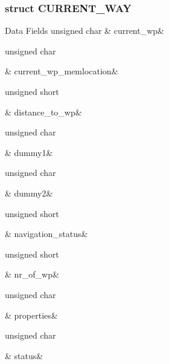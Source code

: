 \subsubsection{struct C\-U\-R\-R\-E\-N\-T\-\_\-\-W\-A\-Y}
\begin{DoxyFields}{Data Fields}
\hypertarget{a00004_a62b91a02c0e7c93551d2875c725ad883}{unsigned char}\label{a00004_a62b91a02c0e7c93551d2875c725ad883}
&
current\-\_\-wp&
\\
\hline

\hypertarget{a00004_aa2932e7efac44e0261ffb6ca5ae02d75}{unsigned char}\label{a00004_aa2932e7efac44e0261ffb6ca5ae02d75}
&
current\-\_\-wp\-\_\-memlocation&
\\
\hline

\hypertarget{a00004_adba24dc812335f36e8793c535dc6e8bf}{unsigned short}\label{a00004_adba24dc812335f36e8793c535dc6e8bf}
&
distance\-\_\-to\-\_\-wp&
\\
\hline

\hypertarget{a00004_ac5cfc788ccc5ab799064b736f3dde3f7}{unsigned char}\label{a00004_ac5cfc788ccc5ab799064b736f3dde3f7}
&
dummy1&
\\
\hline

\hypertarget{a00004_aaee8edca880b2c0e1cc3fb223964aac2}{unsigned char}\label{a00004_aaee8edca880b2c0e1cc3fb223964aac2}
&
dummy2&
\\
\hline

\hypertarget{a00004_a820db34ea9303c6b8f6266107b434058}{unsigned short}\label{a00004_a820db34ea9303c6b8f6266107b434058}
&
navigation\-\_\-status&
\\
\hline

\hypertarget{a00004_a3218be4f5f6d95cd25f617d5cde2450c}{unsigned short}\label{a00004_a3218be4f5f6d95cd25f617d5cde2450c}
&
nr\-\_\-of\-\_\-wp&
\\
\hline

\hypertarget{a00004_a78b61a2d452301b80cd56942bfc362e0}{unsigned char}\label{a00004_a78b61a2d452301b80cd56942bfc362e0}
&
properties&
\\
\hline

\hypertarget{a00004_a54849a1c58ce64ba16a055ad9555a027}{unsigned char}\label{a00004_a54849a1c58ce64ba16a055ad9555a027}
&
status&
\\
\hline

\end{DoxyFields}
\label{d3/d32/a00105}
\hypertarget{a00004_d3/d32/a00105}{}
